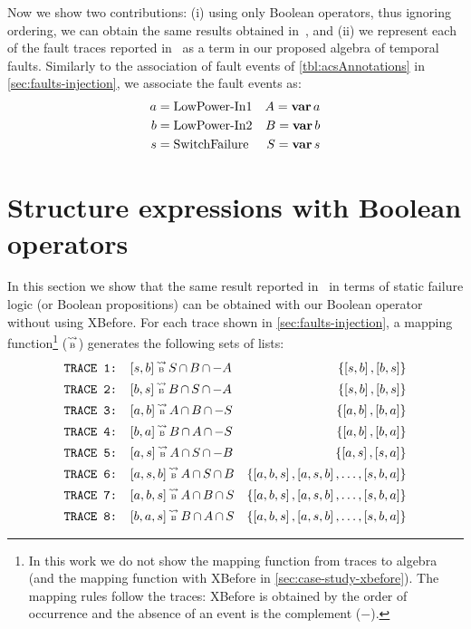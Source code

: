 \documentclass[en,twoside,onehalfspacing,phd]{risethesis}
\def\varop{\ensuremath\operatorname{\mathbf{var}}}
\newcommand{\var}[1]{\ensuremath\varop #1}
\def\tracetobool{\ensuremath\operatorname{\stackrel{\leadsto}{\text{\tiny B}}}}
\newcommand{\setsin}[1]{\ensuremath\left\{ #1 \right\}}
\newcommand{\listsin}[1]{\ensuremath\left[ #1 \right]}
\def\inter{\ensuremath\operatorname{\cap}}
\begin{document}

Now we show two contributions: (i) using only Boolean operators, thus ignoring ordering, we can obtain the same results obtained in~\cite{DM2012}, and (ii) we represent each of the fault traces reported in~\cite{DM2012} as a term in our proposed algebra of temporal faults.
Similarly to the association of fault events of \cref{tbl:acsAnnotations} in \cref{sec:faults-injection}, we associate the fault events as:
%
\begin{align*}
a &= \text{LowPower-In1}& A = \var a\\
b &= \text{LowPower-In2}& B = \var b\\
s &= \text{SwitchFailure}& S = \var s
\end{align*}

\section{Structure expressions with Boolean operators}

In this section we show that the same result reported in~\cite{DM2012} in terms of static failure logic (or Boolean propositions) can be obtained with our Boolean operator without using XBefore.
For each trace shown in \cref{sec:faults-injection}, a mapping function\footnote{In this work we do not show the mapping function from traces to \ac{algebra} (and the mapping function with XBefore in \cref{sec:case-study-xbefore}).
The mapping rules follow the traces: XBefore is obtained by the order of occurrence and the absence of an event is the complement ($-$).} ($\tracetobool$) generates the following sets of lists:
%
\begin{align*}
\text{\texttt{TRACE 1: }}&[s,b] \tracetobool S \inter B \inter -A & \setsin{\listsin{s,b},\listsin{b,s}}\\
\text{\texttt{TRACE 2: }}&[b,s] \tracetobool B \inter S \inter -A & \setsin{\listsin{s,b},\listsin{b,s}}\\
\text{\texttt{TRACE 3: }}&[a,b] \tracetobool A \inter B \inter -S & \setsin{\listsin{a,b},\listsin{b,a}}\\
\text{\texttt{TRACE 4: }}&[b,a] \tracetobool B \inter A \inter -S & \setsin{\listsin{a,b},\listsin{b,a}}\\
\text{\texttt{TRACE 5: }}&[a,s] \tracetobool A \inter S \inter -B & \setsin{\listsin{a,s},\listsin{s,a}}\\
\text{\texttt{TRACE 6: }}&[a,s,b] \tracetobool A \inter S \inter B & \setsin{\listsin{a,b,s},\listsin{a,s,b},\ldots,\listsin{s,b,a}}\\
\text{\texttt{TRACE 7: }}&[a,b,s] \tracetobool A \inter B \inter S & \setsin{\listsin{a,b,s},\listsin{a,s,b},\ldots,\listsin{s,b,a}}\\
\text{\texttt{TRACE 8: }}&[b,a,s] \tracetobool B \inter A \inter S & \setsin{\listsin{a,b,s},\listsin{a,s,b},\ldots,\listsin{s,b,a}}\\
\end{align*}
\end{document}
